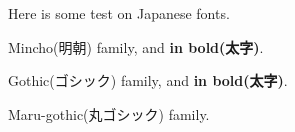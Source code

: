\documentclass[a4paper]{article}
\begin{document}
Here is some test on Japanese fonts.\par
\begin{uCJK*}%
Mincho(明朝) family, and \textbf{in bold(太字)}.\par
\sffamily  %
Gothic(ゴシック) family, and \textbf{in bold(太字)}.\par
\mgfamily  %
Maru-gothic(丸ゴシック) family.
\end{uCJK*}
\end{document}
